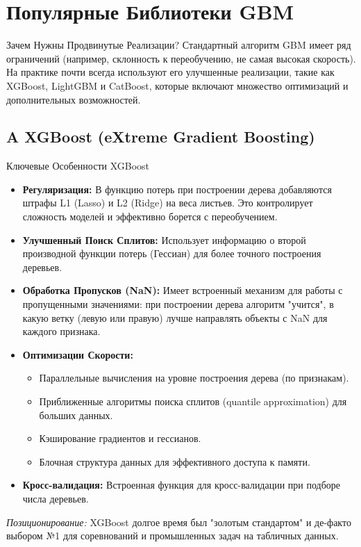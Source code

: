 \section{Популярные Библиотеки GBM}

\begin{textbox}{Зачем Нужны Продвинутые Реализации?}
    Стандартный алгоритм GBM имеет ряд ограничений (например, склонность к переобучению, не самая высокая скорость). На практике почти всегда используют его улучшенные реализации, такие как XGBoost, LightGBM и CatBoost, которые включают множество оптимизаций и дополнительных возможностей.
\end{textbox}

\subsection{A XGBoost (eXtreme Gradient Boosting)}
\begin{myblock}{Ключевые Особенности XGBoost}
    \begin{itemize}[nosep, leftmargin=*]
        \item \textbf{Регуляризация:} В функцию потерь при построении дерева добавляются штрафы L1 (Lasso) и L2 (Ridge) на веса листьев. Это контролирует сложность моделей и эффективно борется с переобучением.
        \item \textbf{Улучшенный Поиск Сплитов:} Использует информацию о второй производной функции потерь (Гессиан) для более точного построения деревьев.
        \item \textbf{Обработка Пропусков (NaN):} Имеет встроенный механизм для работы с пропущенными значениями: при построении дерева алгоритм "учится", в какую ветку (левую или правую) лучше направлять объекты с NaN для каждого признака.
        \item \textbf{Оптимизации Скорости:}
            \begin{itemize}[label=\textbullet, nosep, leftmargin=*]
                 \item Параллельные вычисления на уровне построения дерева (по признакам).
                 \item Приближенные алгоритмы поиска сплитов (quantile approximation) для больших данных.
                 \item Кэширование градиентов и гессианов.
                 \item Блочная структура данных для эффективного доступа к памяти.
            \end{itemize}
        \item \textbf{Кросс-валидация:} Встроенная функция для кросс-валидации при подборе числа деревьев.
    \end{itemize}
    \textit{Позиционирование:} XGBoost долгое время был "золотым стандартом" и де-факто выбором №1 для соревнований и промышленных задач на табличных данных.
\end{myblock}

